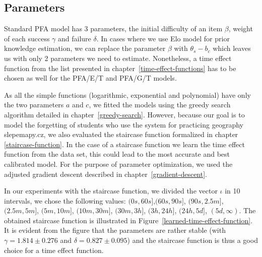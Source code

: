 \subsection{Parameters}
\label{parameters}

Standard PFA model has 3 parameters, the initial difficulty of an item $\beta$, weight of each success $\gamma$ and failure $\delta$. In cases where we use Elo model for prior knowledge estimation, we can replace the parameter $\beta$ with $\theta_s - b_c$ which leaves us with only 2 parameters we need to estimate. Nonetheless, a time effect function from the list presented in chapter~\ref{time-effect-functions} has to be chosen as well for the PFA/E/T and PFA/G/T models.

As all the simple functions (logarithmic, exponential and polynomial) have only the two parameters $a$ and $c$, we fitted the models using the greedy search algorithm detailed in chapter~\ref{greedy-search}. However, because our goal is to model the forgetting of students who use the system for practicing geography slepemapy.cz, we also evaluated the staircase function formalized in chapter \ref{staircase-function}. In the case of a staircase function we learn the time effect function from the data set, this could lead to the most accurate and best calibrated model. For the purpose of parameter optimization, we used the adjusted gradient descent described in chapter~\ref{gradient-descent}.

In our experiments with the staircase function, we divided the vector $\iota$ in 10 intervals, we chose the following values: $(0s, 60s]$,$(60s, 90s]$, $(90s, 2.5m]$, $(2.5m, 5m]$, $(5m, 10m]$, $(10m, 30m]$, $(30m, 3h]$, $(3h, 24h]$, $(24h, 5d]$, $(5d, \infty)$. The obtained staircase function is illustrated in Figure~\ref{learned-time-effect-function}. It is evident from the figure that the parameters are rather stable (with $\gamma = 1.814 \pm 0.276$ and $\delta = 0.827 \pm 0.095$) and the staircase function is thus a good choice for a time effect function.

